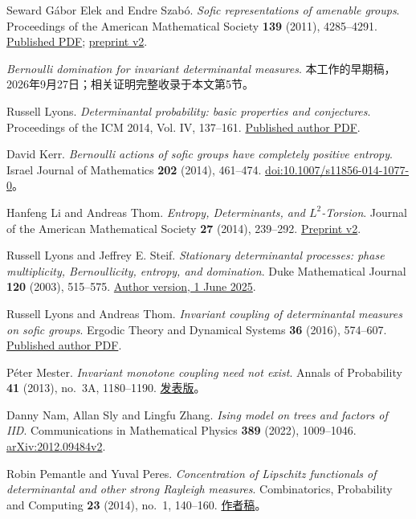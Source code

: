 \documentclass[UTF8,zihao=-4,a4paper]{ctexart}
\numberwithin{equation}{section}
\begin{document}
\begin{thebibliography}{Seward}
 Gábor Elek and Endre Szabó. \emph{Sofic representations of amenable groups}. Proceedings of the American Mathematical Society \textbf{139} (2011), 4285--4291. \href{https://www.ams.org/proc/2011-139-12/S0002-9939-2011-11222-X/S0002-9939-2011-11222-X.pdf}{Published PDF}; \href{https://arxiv.org/pdf/1010.3424v2}{preprint v2}.

 \emph{Bernoulli domination for invariant determinantal measures}. 本工作的早期稿，2026年9月27日；相关证明完整收录于本文第5节。

 Russell Lyons. \emph{Determinantal probability: basic properties and conjectures}. Proceedings of the ICM 2014, Vol. IV, 137--161. \href{https://rdlyons.pages.iu.edu/pdf/icm-pub.pdf}{Published author PDF}.

 David Kerr. \emph{Bernoulli actions of sofic groups have completely positive entropy}. Israel Journal of Mathematics \textbf{202} (2014), 461--474. \href{https://doi.org/10.1007/s11856-014-1077-0}{doi:10.1007/s11856-014-1077-0}。

 Hanfeng Li and Andreas Thom. \emph{Entropy, Determinants, and \(L^2\)-Torsion}. Journal of the American Mathematical Society \textbf{27} (2014), 239--292. \href{https://arxiv.org/pdf/1202.1213v2}{Preprint v2}.

 Russell Lyons and Jeffrey E. Steif. \emph{Stationary determinantal processes: phase multiplicity, Bernoullicity, entropy, and domination}. Duke Mathematical Journal \textbf{120} (2003), 515--575. \href{https://rdlyons.pages.iu.edu/pdf/dyn.pdf}{Author version, 1 June 2025}.

 Russell Lyons and Andreas Thom. \emph{Invariant coupling of determinantal measures on sofic groups}. Ergodic Theory and Dynamical Systems \textbf{36} (2016), 574--607. \href{https://rdlyons.pages.iu.edu/pdf/couple-pub.pdf}{Published author PDF}.

 Péter Mester. \emph{Invariant monotone coupling need not exist}. Annals of Probability \textbf{41} (2013), no.~3A, 1180--1190. \href{https://arxiv.org/pdf/1011.2283v2}{发表版}。

 Danny Nam, Allan Sly and Lingfu Zhang. \emph{Ising model on trees and factors of IID}. Communications in Mathematical Physics \textbf{389} (2022), 1009--1046. \href{https://arxiv.org/abs/2012.09484v2}{arXiv:2012.09484v2}.

 Robin Pemantle and Yuval Peres. \emph{Concentration of Lipschitz functionals of determinantal and other strong Rayleigh measures}. Combinatorics, Probability and Computing \textbf{23} (2014), no.~1, 140--160. \href{https://arxiv.org/pdf/1108.0687v3}{作者稿}。


\end{thebibliography}
\end{document}
